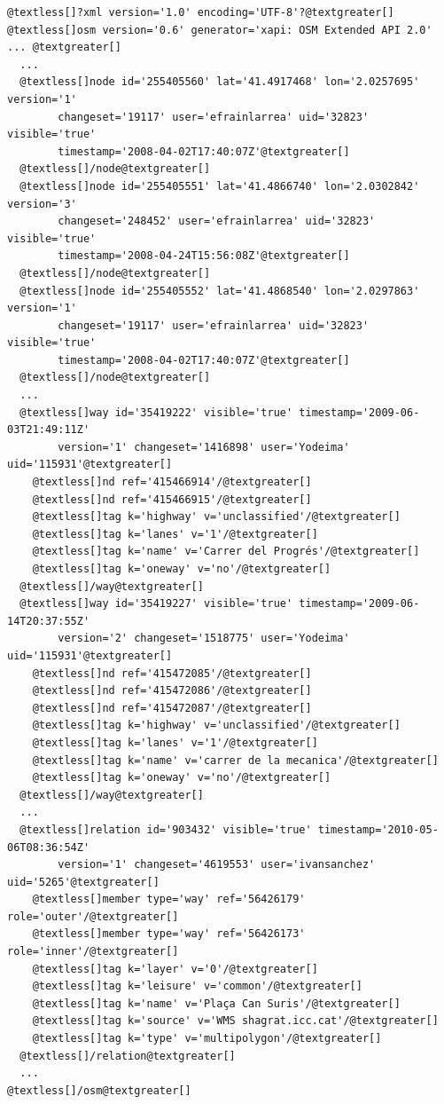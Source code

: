 \documentclass[a4paper,10pt,english]{manual}
\begin{document}
\begin{Verbatim}[commandchars=@\[\]]
@textless[]?xml version='1.0' encoding='UTF-8'?@textgreater[]
@textless[]osm version='0.6' generator='xapi: OSM Extended API 2.0' ... @textgreater[]
  ...	
  @textless[]node id='255405560' lat='41.4917468' lon='2.0257695' version='1' 
  		changeset='19117' user='efrainlarrea' uid='32823' visible='true' 
  		timestamp='2008-04-02T17:40:07Z'@textgreater[]
  @textless[]/node@textgreater[]
  @textless[]node id='255405551' lat='41.4866740' lon='2.0302842' version='3' 
  		changeset='248452' user='efrainlarrea' uid='32823' visible='true' 
  		timestamp='2008-04-24T15:56:08Z'@textgreater[]
  @textless[]/node@textgreater[]
  @textless[]node id='255405552' lat='41.4868540' lon='2.0297863' version='1' 
  		changeset='19117' user='efrainlarrea' uid='32823' visible='true' 
  		timestamp='2008-04-02T17:40:07Z'@textgreater[]
  @textless[]/node@textgreater[]
  ...
  @textless[]way id='35419222' visible='true' timestamp='2009-06-03T21:49:11Z' 
  		version='1' changeset='1416898' user='Yodeima' uid='115931'@textgreater[]
    @textless[]nd ref='415466914'/@textgreater[]
    @textless[]nd ref='415466915'/@textgreater[]
    @textless[]tag k='highway' v='unclassified'/@textgreater[]
    @textless[]tag k='lanes' v='1'/@textgreater[]
    @textless[]tag k='name' v='Carrer del Progrés'/@textgreater[]
    @textless[]tag k='oneway' v='no'/@textgreater[]
  @textless[]/way@textgreater[]
  @textless[]way id='35419227' visible='true' timestamp='2009-06-14T20:37:55Z' 
  		version='2' changeset='1518775' user='Yodeima' uid='115931'@textgreater[]
    @textless[]nd ref='415472085'/@textgreater[]
    @textless[]nd ref='415472086'/@textgreater[]
    @textless[]nd ref='415472087'/@textgreater[]
    @textless[]tag k='highway' v='unclassified'/@textgreater[]
    @textless[]tag k='lanes' v='1'/@textgreater[]
    @textless[]tag k='name' v='carrer de la mecanica'/@textgreater[]
    @textless[]tag k='oneway' v='no'/@textgreater[]
  @textless[]/way@textgreater[]
  ...
  @textless[]relation id='903432' visible='true' timestamp='2010-05-06T08:36:54Z' 
  		version='1' changeset='4619553' user='ivansanchez' uid='5265'@textgreater[]
    @textless[]member type='way' ref='56426179' role='outer'/@textgreater[]
    @textless[]member type='way' ref='56426173' role='inner'/@textgreater[]
    @textless[]tag k='layer' v='0'/@textgreater[]
    @textless[]tag k='leisure' v='common'/@textgreater[]
    @textless[]tag k='name' v='Plaça Can Suris'/@textgreater[]
    @textless[]tag k='source' v='WMS shagrat.icc.cat'/@textgreater[]
    @textless[]tag k='type' v='multipolygon'/@textgreater[]
  @textless[]/relation@textgreater[]
  ...
@textless[]/osm@textgreater[]
\end{Verbatim}
\end{document}
